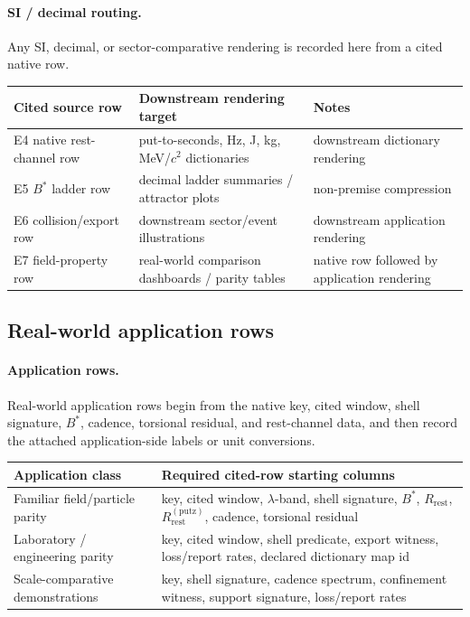 \paragraph{SI / decimal routing.} Any SI, decimal, or sector-comparative rendering is recorded here from a cited native row.

\begin{center}
\begin{tabularx}{\linewidth}{@{}lXl@{}}
\toprule
Cited source row & Downstream rendering target & Notes \\
\midrule
E4 native rest-channel row & put-to-seconds, Hz, J, kg, MeV/$c^2$ dictionaries & downstream dictionary rendering \\
E5 $B^*$ ladder row & decimal ladder summaries / attractor plots & non-premise compression \\
E6 collision/export row & downstream sector/event illustrations & downstream application rendering \\
E7 field-property row & real-world comparison dashboards / parity tables & native row followed by application rendering \\
\bottomrule
\end{tabularx}
\end{center}

\subsection{Real-world application rows}\label{app:realworld-routing}
\paragraph{Application rows.} Real-world application rows begin from the native key, cited window, shell signature, $B^*$, cadence, torsional residual, and rest-channel data, and then record the attached application-side labels or unit conversions.

\begin{center}
\begin{tabularx}{\linewidth}{@{}lX@{}}
\toprule
Application class & Required cited-row starting columns \\
\midrule
Familiar field/particle parity & key, cited window, $\lambda$-band, shell signature, $B^*$, $R_{\mathrm{rest}}$, $R^{(\mathrm{putz})}_{\mathrm{rest}}$, cadence, torsional residual \\
Laboratory / engineering parity & key, cited window, shell predicate, export witness, loss/report rates, declared dictionary map id \\
Scale-comparative demonstrations & key, shell signature, cadence spectrum, confinement witness, support signature, loss/report rates \\
\bottomrule
\end{tabularx}
\end{center}


